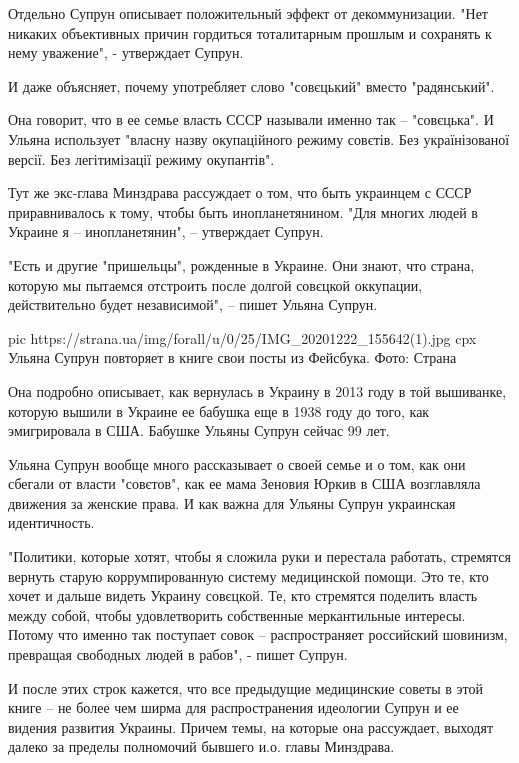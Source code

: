 Отдельно Супрун описывает положительный эффект от декоммунизации. "Нет никаких
объективных причин гордиться тоталитарным прошлым и сохранять к нему уважение",
- утверждает Супрун.
 
И даже объясняет, почему употребляет слово "совєцький" вместо "радянський".
 
Она говорит, что в ее семье власть СССР называли именно так – "совєцька". И
Ульяна использует "власну назву окупаційного режиму совєтів. Без українізованої
версії. Без легітимізації режиму окупантів".
 
Тут же экс-глава Минздрава рассуждает о том, что быть украинцем с СССР
приравнивалось к тому, чтобы быть инопланетянином. "Для многих людей в Украине
я – инопланетянин", – утверждает Супрун.
 
"Есть и другие "пришельцы", рожденные в Украине. Они знают, что страна, которую
мы пытаемся отстроить после долгой совєцкой оккупации, действительно будет
независимой", – пишет Ульяна Супрун.

\ifcmt
pic https://strana.ua/img/forall/u/0/25/IMG_20201222_155642(1).jpg
cpx Ульяна Супрун повторяет в книге свои посты из Фейсбука. Фото: Страна
\fi

Она подробно описывает, как вернулась в Украину в 2013 году в той вышиванке,
которую вышили в Украине ее бабушка еще в 1938 году до того, как эмигрировала в
США. Бабушке Ульяны Супрун сейчас 99 лет.
 
Ульяна Супрун вообще много рассказывает о своей семье и о том, как они сбегали
от власти "совєтов", как ее мама Зеновия Юркив в США возглавляла движения за
женские права. И как важна для Ульяны Супрун украинская идентичность.
 
"Политики, которые хотят, чтобы я сложила руки и перестала работать, стремятся
вернуть старую коррумпированную систему медицинской помощи. Это те, кто хочет и
дальше видеть Украину совєцкой. Те, кто стремятся поделить власть между собой,
чтобы удовлетворить собственные меркантильные интересы. Потому что именно так
поступает совок – распространяет российский шовинизм, превращая свободных людей
в рабов", - пишет Супрун.
 
И после этих строк кажется, что все предыдущие медицинские советы в этой книге
– не более чем ширма для распространения идеологии Супрун и ее видения развития
Украины. Причем темы, на которые она рассуждает, выходят далеко за пределы
полномочий бывшего и.о. главы Минздрава. 
 
